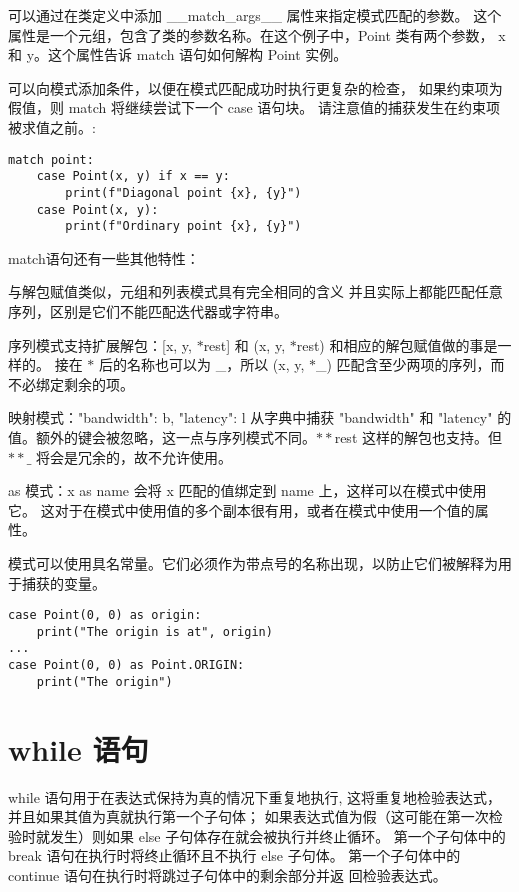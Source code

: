 \documentclass[a4paper, 12pt]{article}
\begin{document}
可以通过在类定义中添加 \_\_match\_args\_\_ 属性来指定模式匹配的参数。
这个属性是一个元组，包含了类的参数名称。在这个例子中，Point 类有两个参数，
x 和 y。这个属性告诉 match 语句如何解构 Point 实例。\par
可以向模式添加条件，以便在模式匹配成功时执行更复杂的检查，
如果约束项为假值，则 match 将继续尝试下一个 case 语句块。 
请注意值的捕获发生在约束项被求值之前。:\par
\begin{listing}[h!]
\begin{verbatim}
match point:
    case Point(x, y) if x == y:
        print(f"Diagonal point {x}, {y}")
    case Point(x, y):
        print(f"Ordinary point {x}, {y}")
\end{verbatim}
\end{listing}
match语句还有一些其他特性：\par
与解包赋值类似，元组和列表模式具有完全相同的含义
并且实际上都能匹配任意序列，区别是它们不能匹配迭代器或字符串。\par
序列模式支持扩展解包：[x, y, $\ast$rest] 和 (x, y, $\ast$rest) 和相应的解包赋值做的事是一样的。
接在 $\ast$ 后的名称也可以为 \_，所以 (x, y, $\ast$\_) 匹配含至少两项的序列，而不必绑定剩余的项。\par
映射模式：{"bandwidth": b, "latency": l} 从字典中捕获 "bandwidth" 
和 "latency" 的值。额外的键会被忽略，这一点与序列模式不同。$\ast\ast$rest 
这样的解包也支持。但 $\ast\ast\_$ 将会是冗余的，故不允许使用。\par
as 模式：x as name 会将 x 匹配的值绑定到 name 上，这样可以在模式中使用它。
这对于在模式中使用值的多个副本很有用，或者在模式中使用一个值的属性。\par
模式可以使用具名常量。它们必须作为带点号的名称出现，以防止它们被解释为用于捕获的变量。\par
\begin{listing}[h!]
\begin{verbatim}
case Point(0, 0) as origin:
    print("The origin is at", origin)
...
case Point(0, 0) as Point.ORIGIN:
    print("The origin")
\end{verbatim}  
\end{listing}

\section{while 语句}
while 语句用于在表达式保持为真的情况下重复地执行,
这将重复地检验表达式，并且如果其值为真就执行第一个子句体；
如果表达式值为假（这可能在第一次检验时就发生）则如果 else 
子句体存在就会被执行并终止循环。
第一个子句体中的 break 语句在执行时将终止循环且不执行 else 子句体。 
第一个子句体中的 continue 语句在执行时将跳过子句体中的剩余部分并返
回检验表达式。
\end{document}

